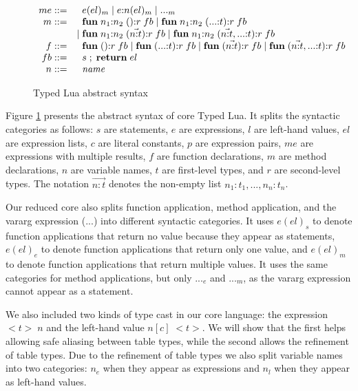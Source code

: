 \begin{figure}[!ht]
$$\begin{array}{rl}
me ::= & \;\; e(el)_{m} \; | \;
e{:}n(el)_{m} \; | \;
{...}_{m}\\
m ::= & \;\; \mathbf{fun} \; n_{1}{:}n_{2} \; (){:}r \; fb \; | \;
\mathbf{fun} \; n_{1}{:}n_{2} \; ({...}{:}t){:}r \; fb\\
& | \; \mathbf{fun} \; n_{1}{:}n_{2} \; (\vec{n{:}t}){:}r \; fb \; | \;
\mathbf{fun} \; n_{1}{:}n_{2} \; (\vec{n{:}t},{...}{:}t){:}r \; fb\\
f ::= & \;\; \mathbf{fun} \; (){:}r \; fb \; | \;
\mathbf{fun} \; ({...}{:}t){:}r \; fb \; | \;
\mathbf{fun} \; (\vec{n{:}t}){:}r \; fb \; | \;
\mathbf{fun} \; (\vec{n{:}t},{...}{:}t){:}r \; fb\\
fb ::= & \;\; s \;;\; \mathbf{return} \; el\\
n ::= & \;\; {\it name}\\
\end{array}
$$
\dend
\caption{Typed Lua abstract syntax}
\label{fig:syntax}
\end{figure}

Figure \ref{fig:syntax} presents the abstract syntax of core Typed Lua.
It splits the syntactic categories as follows:
$s$ are statements, $e$ are expressions, $l$ are left-hand values,
$el$ are expression lists, $c$ are literal constants, $p$ are expression pairs,
$me$ are expressions with multiple results, $f$ are function declarations,
$m$ are method declarations, $n$ are variable names,
$t$ are first-level types, and $r$ are second-level types.
The notation $\vec{n{:}t}$ denotes the non-empty list
$n_{1}{:}t_{1}, ..., n_{n}{:}t_{n}$.

Our reduced core also splits function application, method application, and
the vararg expression (${...}$) into different syntactic categories.
It uses $e(el)_{s}$ to denote function applications that return no value
because they appear as statements,
$e(el)_{e}$ to denote function applications that return only one value,
and $e(el)_{m}$ to denote function applications that return multiple values.
It uses the same categories for method applications, but only ${...}_{e}$
and ${...}_{m}$, as the vararg expression cannot appear as a statement.

We also included two kinds of type cast in our core language:
the expression ${<}t{>} \;n$ and the left-hand value $n[c] \; {<}t{>}$.
We will show that the first helps allowing safe aliasing between
table types, while the second allows the refinement of table types.
Due to the refinement of table types we also split variable names
into two categories: $n_{e}$ when they appear as expressions and
$n_{l}$ when they appear as left-hand values.

